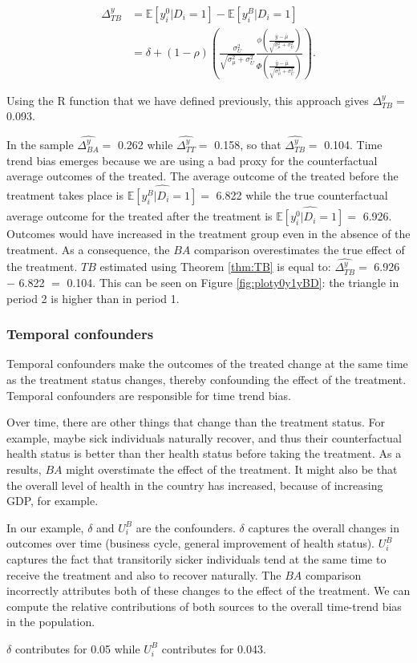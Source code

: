 \documentclass[]{book}
\newcommand{\esp}[1]{\mathbb{E}[ #1 ]}
\theoremstyle{definition}
\theoremstyle{definition}
\theoremstyle{definition}
\theoremstyle{remark}
\let\BeginKnitrBlock\begin \let\EndKnitrBlock\end
\begin{document}
\begin{align*}
\Delta^y_{TB} & = \esp{y_i^0|D_i=1}-\esp{y_i^B|D_i=1} \\
              & = \delta + (1-\rho)\left(\frac{\sigma^2_{U}}{\sqrt{\sigma^2_{\mu}+\sigma^2_{U}}}\frac{\phi\left(\frac{\bar{y}-\bar{\mu}}{\sqrt{\sigma^2_{\mu}+\sigma^2_{U}}}\right)}{\Phi\left(\frac{\bar{y}-\bar{\mu}}{\sqrt{\sigma^2_{\mu}+\sigma^2_{U}}}\right)}\right).
\end{align*}

Using the R function that we have defined previously, this approach
gives \(\Delta^y_{TB}=\) 0.093.

In the sample \(\hat{\Delta^y_{BA}}=\) 0.262 while
\(\hat{\Delta^y_{TT}}=\) 0.158, so that \(\hat{\Delta^y_{TB}}=\) 0.104.
Time trend bias emerges because we are using a bad proxy for the
counterfactual average outcomes of the treated. The average outcome of
the treated before the treatment takes place is
\(\hat{\esp{y_i^B|D_i=1}}=\) 6.822 while the true counterfactual average
outcome for the treated after the treatment is
\(\hat{\esp{y_i^0|D_i=1}}=\) 6.926. Outcomes would have increased in the
treatment group even in the absence of the treatment. As a consequence,
the \(BA\) comparison overestimates the true effect of the treatment.
\(TB\) estimated using Theorem \ref{thm:TB} is equal to:
\(\hat{\Delta^y_{TB}}=\) 6.926 \(-\) 6.822 \(=\) 0.104. This can be seen
on Figure \ref{fig:ploty0y1yBD}: the triangle in period 2 is higher than
in period 1.

\subsubsection{Temporal confounders}\label{temporal-confounders}

Temporal confounders make the outcomes of the treated change at the same
time as the treatment status changes, thereby confounding the effect of
the treatment. Temporal confounders are responsible for time trend bias.

Over time, there are other things that change than the treatment status.
For example, maybe sick individuals naturally recover, and thus their
counterfactual health status is better than ther health status before
taking the treatment. As a results, \(BA\) might overstimate the effect
of the treatment. It might also be that the overall level of health in
the country has increased, because of increasing GDP, for example.

\BeginKnitrBlock{example}
\protect\hypertarget{exm:unnamed-chunk-29}{}{\label{exm:unnamed-chunk-29}
}In our example, \(\delta\) and \(U_i^B\) are the confounders.
\(\delta\) captures the overall changes in outcomes over time (business
cycle, general improvement of health status). \(U^B_i\) captures the
fact that transitorily sicker individuals tend at the same time to
receive the treatment and also to recover naturally. The \(BA\)
comparison incorrectly attributes both of these changes to the effect of
the treatment. We can compute the relative contributions of both sources
to the overall time-trend bias in the population.
\EndKnitrBlock{example} \(\delta\) contributes for 0.05 while \(U^B_i\)
contributes for 0.043.
\end{document}
